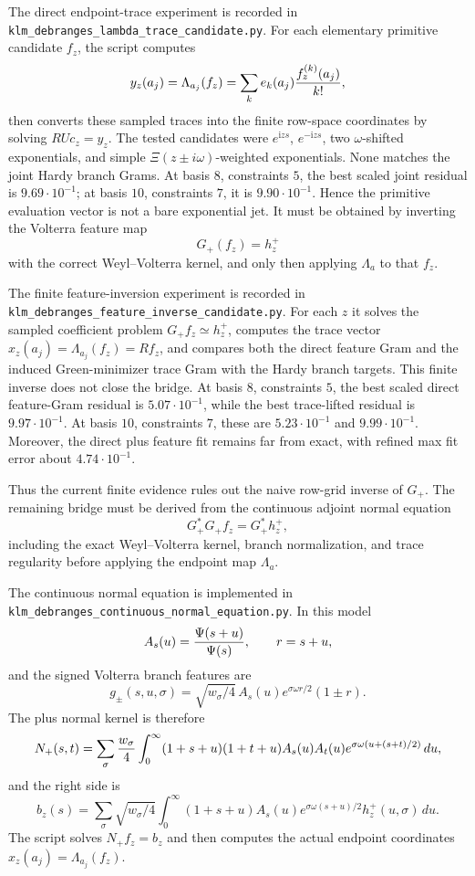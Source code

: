 \documentclass[11pt]{article}
\newcommand{\ii}{\mathrm i}
\begin{document}
The direct endpoint-trace experiment is recorded in
\texttt{klm\_debranges\_lambda\_trace\_candidate.py}.  For each elementary
primitive candidate \(f_z\), the script computes
\[
  y_z(a_j)=\Lambda_{a_j}(f_z)
  =\sum_k e_k(a_j){f_z^{(k)}(a_j)\over k!},
\]
then converts these sampled traces into the finite row-space coordinates by
solving \(RUc_z=y_z\).  The tested candidates were \(e^{\ii zs}\),
\(e^{-\ii zs}\), two \(\omega\)-shifted exponentials, and simple
\(\Xi(z\pm i\omega)\)-weighted exponentials.  None matches the joint Hardy
branch Grams.  At basis \(8\), constraints \(5\), the best scaled joint
residual is \(9.69\cdot10^{-1}\); at basis \(10\), constraints \(7\), it is
\(9.90\cdot10^{-1}\).  Hence the primitive evaluation vector is not a bare
exponential jet.  It must be obtained by inverting the Volterra feature map
\[
  G_+(f_z)=h_z^+
\]
with the correct Weyl--Volterra kernel, and only then applying \(\Lambda_a\)
to that \(f_z\).

The finite feature-inversion experiment is recorded in
\texttt{klm\_debranges\_feature\_inverse\_candidate.py}.  For each \(z\) it
solves the sampled coefficient problem \(G_+f_z\simeq h_z^+\), computes the
trace vector \(x_z(a_j)=\Lambda_{a_j}(f_z)=Rf_z\), and compares both the direct
feature Gram and the induced Green-minimizer trace Gram with the Hardy branch
targets.  This finite inverse does not close the bridge.  At basis \(8\),
constraints \(5\), the best scaled direct feature-Gram residual is
\(5.07\cdot10^{-1}\), while the best trace-lifted residual is
\(9.97\cdot10^{-1}\).  At basis \(10\), constraints \(7\), these are
\(5.23\cdot10^{-1}\) and \(9.99\cdot10^{-1}\).  Moreover, the direct plus
feature fit remains far from exact, with refined max fit error about
\(4.74\cdot10^{-1}\).

Thus the current finite evidence rules out the naive row-grid inverse of
\(G_+\).  The remaining bridge must be derived from the continuous adjoint
normal equation
\[
  G_+^\ast G_+ f_z = G_+^\ast h_z^+,
\]
including the exact Weyl--Volterra kernel, branch normalization, and trace
regularity before applying the endpoint map \(\Lambda_a\).

The continuous normal equation is implemented in
\texttt{klm\_debranges\_continuous\_normal\_equation.py}.  In this model
\[
  A_s(u)={\Psi(s+u)\over \Psi(s)},\qquad r=s+u,
\]
and the signed Volterra branch features are
\[
  g_\pm(s,u,\sigma)
  =
  \sqrt{w_\sigma/4}\,
  A_s(u)e^{\sigma\omega r/2}(1\pm r).
\]
The plus normal kernel is therefore
\[
  N_+(s,t)
  =
  \sum_\sigma {w_\sigma\over 4}
  \int_0^\infty
  (1+s+u)(1+t+u)A_s(u)A_t(u)
  e^{\sigma\omega(u+(s+t)/2)}\,du,
\]
and the right side is
\[
  b_z(s)=
  \sum_\sigma \sqrt{w_\sigma/4}
  \int_0^\infty
  (1+s+u)A_s(u)e^{\sigma\omega(s+u)/2}h_z^+(u,\sigma)\,du .
\]
The script solves \(N_+f_z=b_z\) and then computes the actual endpoint
coordinates \(x_z(a_j)=\Lambda_{a_j}(f_z)\).
\end{document}
